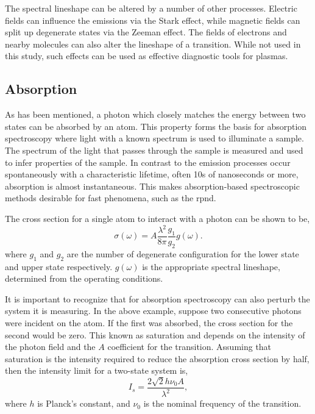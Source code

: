 The spectral lineshape can be altered by a number of other processes. Electric
fields can influence the emissions via the Stark effect, while magnetic fields
can split up degenerate states via the Zeeman effect. The fields of electrons
and nearby molecules can also alter the lineshape of a transition. While not
used in this study, such effects can be used as effective diagnostic tools for
plasmas.

\subsection{Absorption}

As has been mentioned, a photon which closely matches the energy between two
states can be absorbed by an atom. This property forms the basis for absorption
spectroscopy where light with a known spectrum is used to illuminate a sample.
The spectrum of the light that passes through the sample is measured and used to
infer properties of the sample. In contrast to the emission processes occur
spontaneously with a characteristic lifetime, often 10s of nanoseconds or more,
absorption is almost instantaneous. This makes absorption-based spectroscopic
methods desirable for fast phenomena, such as the \acs{rpnd}.

The cross section for a single atom to interact with a photon can be shown
\cite{Siegman1986} to be,
\begin{equation}
  \sigma(\omega) = A \frac{\lambda^2}{8\pi}\frac{g_1}{g_2}g(\omega).
\end{equation}
where $g_1$ and $g_2$ are the number of degenerate configuration for the lower
state and upper state respectively. $g(\omega)$ is the appropriate spectral
lineshape, determined from the operating conditions.

It is important to recognize that for absorption spectroscopy can also perturb
the system it is measuring. In the above example, suppose two consecutive
photons were incident on the atom. If the first was absorbed, the cross section
for the second would be zero. This known as saturation and depends on the
intensity of the photon field and the $A$ coefficient for the transition.
Assuming that saturation is the intensity required to reduce the absorption
cross section by half, then the intensity limit for a two-state system is,
\begin{equation}
  I_s = \frac{2\sqrt{2}h\nu_0A}{\lambda^2},
\end{equation}
where $h$ is Planck's constant, and $\nu_0$ is the nominal frequency of the
transition.


